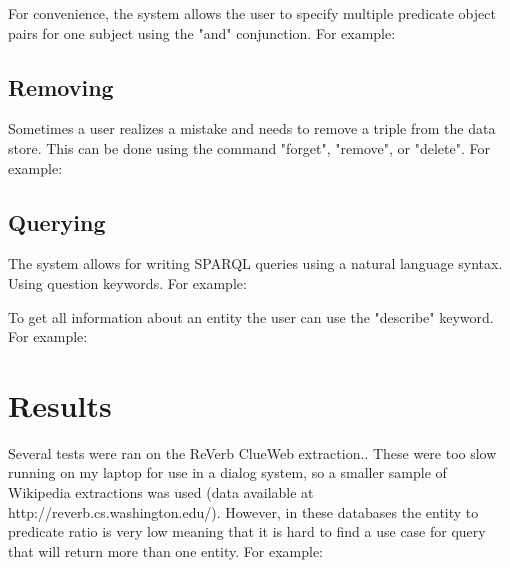 \documentclass[11pt]{article}
\begin{document}




For convenience, the system allows the user to specify multiple predicate object pairs for one subject using the "and" conjunction. For example:


\subsection{Removing}
Sometimes a user realizes a mistake and needs to remove a triple from the data store. This can be done using the command "forget", "remove", or "delete". For example:





\subsection{Querying}
The system allows for writing SPARQL queries using a natural language syntax. Using question keywords. For example:



To get all information about an entity the user can use the "describe" keyword. For example:



\section{Results}
Several tests were ran on the ReVerb ClueWeb extraction.\cite{ReVerb2011}. These were too slow running on my laptop for use in a dialog system, so a smaller sample of Wikipedia extractions was used (data available at http://reverb.cs.washington.edu/). However, in these databases the entity to predicate ratio is very low meaning that it is hard to find a use case for query that will return more than one entity. For example:
\end{document}
